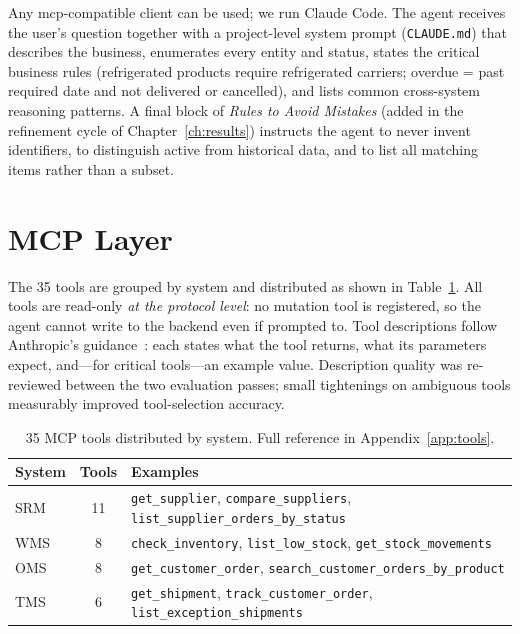Any \gls{mcp}-compatible client can be used; we run Claude Code. The agent receives the user's question together with a project-level system prompt (\texttt{CLAUDE.md}) that describes the business, enumerates every entity and status, states the critical business rules (refrigerated products require refrigerated carriers; overdue = past required date and not delivered or cancelled), and lists common cross-system reasoning patterns. A final block of \emph{Rules to Avoid Mistakes} (added in the refinement cycle of Chapter~\ref{ch:results}) instructs the agent to never invent identifiers, to distinguish active from historical data, and to list all matching items rather than a subset.

\section{MCP Layer}

The 35 tools are grouped by system and distributed as shown in Table~\ref{tab:toolcount}. All tools are read-only \emph{at the protocol level}: no mutation tool is registered, so the agent cannot write to the backend even if prompted to. Tool descriptions follow Anthropic's guidance~\cite{anthropic2025writingtools}: each states what the tool returns, what its parameters expect, and---for critical tools---an example value. Description quality was re-reviewed between the two evaluation passes; small tightenings on ambiguous tools measurably improved tool-selection accuracy.

\begin{table}[H]
    \centering\small
    \begin{tabularx}{\textwidth}{|l|c|X|}
        \hline
        \rowcolor{lightgray}
        \textbf{System} & \textbf{Tools} & \textbf{Examples} \\
        \hline
        SRM & 11 & \texttt{get\_supplier}, \texttt{compare\_suppliers}, \texttt{list\_supplier\_orders\_by\_status} \\
        \hline
        WMS & 8  & \texttt{check\_inventory}, \texttt{list\_low\_stock}, \texttt{get\_stock\_movements} \\
        \hline
        OMS & 8  & \texttt{get\_customer\_order}, \texttt{search\_customer\_orders\_by\_product} \\
        \hline
        TMS & 6  & \texttt{get\_shipment}, \texttt{track\_customer\_order}, \texttt{list\_exception\_shipments} \\
        \hline
    \end{tabularx}
    \caption{35 MCP tools distributed by system. Full reference in Appendix~\ref{app:tools}.}
    \label{tab:toolcount}
\end{table}

